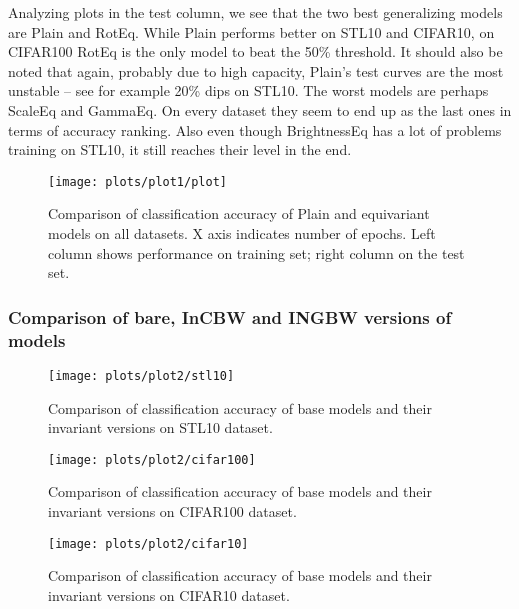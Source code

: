     Analyzing plots in the test column, we see that the two best generalizing
    models are Plain and RotEq. While Plain performs better on STL10 and
    CIFAR10, on CIFAR100 RotEq is the only model to beat the 50\% threshold.
    It should also be noted that again, probably due to high capacity, Plain's
    test curves are the most unstable -- see for example 20\% dips on STL10.
    The worst models are perhaps ScaleEq and GammaEq. On every dataset they seem
    to end up as the last ones in terms of accuracy ranking.
    Also even though BrightnessEq has a lot of problems training on STL10, it
    still reaches their level in the end.

    \begin{figure}[h]
        \centering
        \texttt{[image: plots/plot1/plot]}
        \caption{Comparison of classification accuracy of
            Plain and equivariant models on all datasets. X axis indicates
            number of epochs. Left column shows performance on training set;
        right column on the test set.}
        \label{fig:plot1}
    \end{figure}


    \subsubsection*{Comparison of bare, InCBW and INGBW versions of models}
    \begin{figure}[h]
        \centering
        \texttt{[image: plots/plot2/stl10]}
        \caption{Comparison of classification accuracy of base models and their
            invariant versions on STL10 dataset.}
        \label{fig:plot2stl10}
    \end{figure}
    \begin{figure}[h]
        \centering
        \texttt{[image: plots/plot2/cifar100]}
        \caption{Comparison of classification accuracy of base models and their
            invariant versions on CIFAR100 dataset.}
        \label{fig:plot2cifar100}
    \end{figure}
    \begin{figure}[h]
        \centering
        \texttt{[image: plots/plot2/cifar10]}
        \caption{Comparison of classification accuracy of base models and their
            invariant versions on CIFAR10 dataset.}
        \label{fig:plot2cifar10}
    \end{figure}




